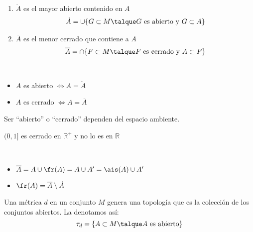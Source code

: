 	\begin{proposicion}\ 
		\begin{enumerate}[1)]
			\item $\mathring{A}$ es el mayor abierto contenido en $A$ 
				\begin{align*}
					\mathring{A} =\cup\{ G \subset M\talque G \mathrm{\ es\ abierto\ y\ } G\subset A\}
				\end{align*}
			\item $\overline A$ es el menor cerrado que contiene a $A$
				\begin{align*}
					\overline A=\cap\{F\subset M\talque F \mathrm{\ es\ cerrado\ y\ } A\subset F\}
				\end{align*}
		\end{enumerate}
	\end{proposicion}
	
	\begin{proposicion} \ 
		\begin{itemize}
			\item $A$ es abierto $\iff A = \mathring{A}$
			\item $A$ es cerrado $\iff A =\overline{A}$ \\
		\end{itemize}
	\end{proposicion}
	
	\begin{nota}Ser ``abierto'' o ``cerrado'' dependen del espacio ambiente.
		\begin{ejem} $(0,1]$ es cerrado en $\mathbb{R}^+$ y no lo es en $\mathbb{R}$\\
		\end{ejem}
	\end{nota}
	
	\begin{proposicion} \ 
		\begin{itemize}
			\item $\overline{A}= A\cup \fr(A)=A\cup A'=\ais(A)\cup A'$
			\item $\fr(A)=\overline{A}\setminus\mathring{A}$
		\end{itemize}
	\end{proposicion}	
	
	\begin{defi}Una m\'etrica $d$ en un conjunto $M$ genera una topolog\'ia que es la colecci\'on de los conjuntos abiertos. La denotamos as\'i:
	\[\tau_d=\{A\subset M\talque A \mathrm{\ es\ abierto}\}\]
	\end{defi}
	
